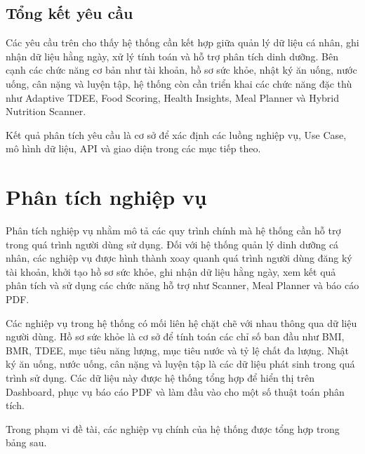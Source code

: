 \documentclass[12pt, a4paper]{report}
\begin{document}
\subsection{Tổng kết yêu cầu}Các yêu cầu trên cho thấy hệ thống cần kết hợp giữa quản lý dữ liệu cá nhân, ghi nhận dữ liệu hằng ngày, xử lý tính toán và hỗ trợ phân tích dinh dưỡng. Bên cạnh các chức năng cơ bản như tài khoản, hồ sơ sức khỏe, nhật ký ăn uống, nước uống, cân nặng và luyện tập, hệ thống còn cần triển khai các chức năng đặc thù như Adaptive TDEE, Food Scoring, Health Insights, Meal Planner và Hybrid Nutrition Scanner.

Kết quả phân tích yêu cầu là cơ sở để xác định các luồng nghiệp vụ, Use Case, mô hình dữ liệu, API và giao diện trong các mục tiếp theo.

\section{Phân tích nghiệp vụ}Phân tích nghiệp vụ nhằm mô tả các quy trình chính mà hệ thống cần hỗ trợ trong quá trình người dùng sử dụng. Đối với hệ thống quản lý dinh dưỡng cá nhân, các nghiệp vụ được hình thành xoay quanh quá trình người dùng đăng ký tài khoản, khởi tạo hồ sơ sức khỏe, ghi nhận dữ liệu hằng ngày, xem kết quả phân tích và sử dụng các chức năng hỗ trợ như Scanner, Meal Planner và báo cáo PDF.

Các nghiệp vụ trong hệ thống có mối liên hệ chặt chẽ với nhau thông qua dữ liệu người dùng. Hồ sơ sức khỏe là cơ sở để tính toán các chỉ số ban đầu như BMI, BMR, TDEE, mục tiêu năng lượng, mục tiêu nước và tỷ lệ chất đa lượng. Nhật ký ăn uống, nước uống, cân nặng và luyện tập là các dữ liệu phát sinh trong quá trình sử dụng. Các dữ liệu này được hệ thống tổng hợp để hiển thị trên Dashboard, phục vụ báo cáo PDF và làm đầu vào cho một số thuật toán phân tích.

Trong phạm vi đề tài, các nghiệp vụ chính của hệ thống được tổng hợp trong bảng sau.
\end{document}
